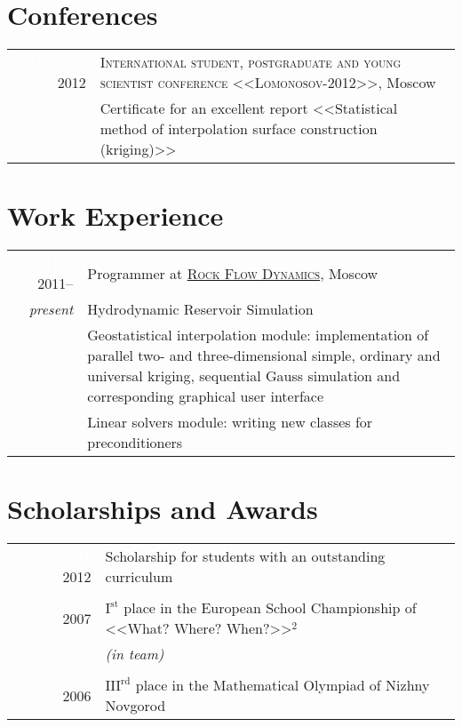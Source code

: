 \documentclass[a4paper,10pt]{article}
\begin{document}
\section{Conferences}
\begin{tabular}{r|p{13cm}}
 \textcolor{white}{11111111} 2012 & \textsc{International student, postgraduate and young scientist conference <<Lomonosov-2012>>}, Moscow\\
 & \footnotesize{Certificate for an excellent report <<Statistical method of interpolation surface construction (kriging)>>}
\end{tabular}

\section{Work Experience}
\begin{tabular}{r|p{13cm}}
 \textcolor{white}{1111111} 2011-- & Programmer at \href{http://rfdyn.com/}{\textsc{Rock Flow Dynamics}}, Moscow \\
 \emph{present}& Hydrodynamic Reservoir Simulation\\
 & \footnotesize {Geostatistical interpolation module: implementation of parallel two- and three-dimensional simple, ordinary and universal kriging,
 sequential Gauss simulation and corresponding graphical user interface} \\
 &\footnotesize {Linear solvers module: writing new classes for preconditioners}\\
\end{tabular}


\section{Scholarships and Awards}
\begin{tabular}{r|p{13cm}}

 \textcolor{white}{11111111} 2012 & Scholarship for students with an outstanding curriculum \\  
 
\multicolumn{2}{c}{} \\

 2007 & $\textrm{I}^{\textrm{st}}$ place in the European School Championship of <<What? Where? When?>>$^2$ \\
      & \textit{(in team)}\\
 
\multicolumn{2}{c}{} \\

 2006 & $\textrm{III}^{\textrm{rd}}$ place in the Mathematical Olympiad of Nizhny Novgorod \\
 
\end{tabular}
\linebreak
\end{document}
